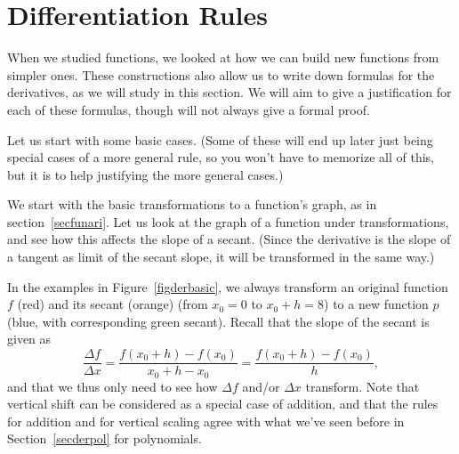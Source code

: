 \section{Differentiation Rules}

When we studied functions, we looked at how we can build new functions from
simpler ones. These constructions also allow us to write down formulas for the
derivatives, as we will study in this section. We will aim to give a
justification for each of these formulas, though will not always give a
formal proof.

Let us start with some basic cases. (Some of these will end up later just
being special cases of a more general rule, so you won't have to memorize
all of this, but it is to help justifying the more general cases.)

We start with the basic transformations to a function's graph, as in
section~\ref{secfunari}. Let us look at the graph of a function under
transformations, and see how this affects the slope of a secant. (Since the
derivative is the slope of a tangent as limit of the secant slope, it will
be transformed in the same way.)

In the examples in Figure~\ref{figderbasic}, we always transform an original function $f$
(red) and its secant (orange) (from $x_0=0$ to $x_0+h=8$)
to a new function $p$ (blue, with
corresponding green secant). Recall that the slope of the secant is given as
\[
\frac{\Delta f}{\Delta x}=\frac{f(x_0+h)-f(x_0)}{x_0+h-x_0}
=\frac{f(x_0+h)-f(x_0)}{h},
\]
and that we thus only need to see how $\Delta f$ and/or $\Delta x$
transform. Note that vertical shift can be considered as a special case of
addition, and that the rules for addition and for vertical scaling
agree with what we've seen before in Section~\ref{secderpol} for
polynomials.

